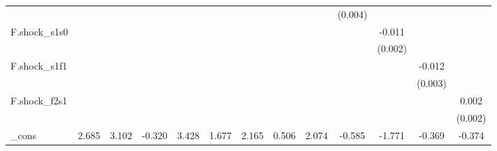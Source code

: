 {\begin{tabular}{l*{12}{c}}
            &                     &                     &                     &                     &                     &                     &                     &                     &     (0.004)         &                     &                     &                     \\
\addlinespace
F.shock\_s1s0&                     &                     &                     &                     &                     &                     &                     &                     &                     &      -0.011\sym{***}&                     &                     \\
            &                     &                     &                     &                     &                     &                     &                     &                     &                     &     (0.002)         &                     &                     \\
\addlinespace
F.shock\_s1f1&                     &                     &                     &                     &                     &                     &                     &                     &                     &                     &      -0.012\sym{***}&                     \\
            &                     &                     &                     &                     &                     &                     &                     &                     &                     &                     &     (0.003)         &                     \\
\addlinespace
F.shock\_f2s1&                     &                     &                     &                     &                     &                     &                     &                     &                     &                     &                     &       0.002         \\
            &                     &                     &                     &                     &                     &                     &                     &                     &                     &                     &                     &     (0.002)         \\
\addlinespace
\_cons      &       2.685\sym{***}&       3.102\sym{***}&      -0.320         &       3.428\sym{***}&       1.677\sym{**} &       2.165\sym{***}&       0.506         &       2.074\sym{**} &      -0.585\sym{**} &      -1.771\sym{***}&      -0.369\sym{**} &      -0.374\sym{**} \\

\end{tabular}}
